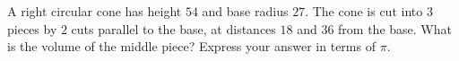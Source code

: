 A right circular cone has height $54$ and base radius $27$. The cone is cut into $3$ pieces by $2$ cuts parallel to the base, at distances $18$ and $36$ from the base. What is the volume of the middle piece? Express your answer in terms of $\pi$.
